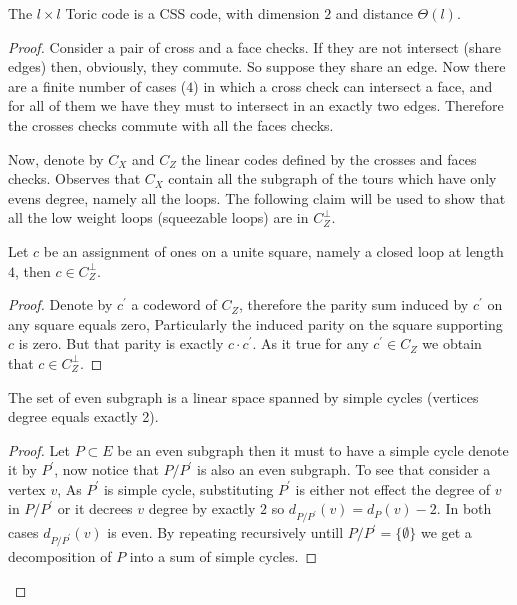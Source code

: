 \begin{claim}
  The $l \times l$  Toric code is a CSS code, with dimension $2$ and distance $\Theta\left( l \right)$.   
\end{claim}
\begin{proof}
  Consider a pair of cross and a face checks. If they are not intersect (share edges) then, obviously, they commute. So suppose they share an edge. Now there are a finite number of cases ($4$) in which a cross check can intersect a face, and for all of them we have they must to intersect in an exactly two edges. Therefore the crosses checks commute with all the faces checks. 

  Now, denote by $C_{X}$ and $C_{Z}$ the linear codes defined by the crosses and faces checks. Observes that $C_{X}$ contain all the subgraph of the tours which have only evens degree, namely all the loops. The following claim will be used to show that all the low weight loops (squeezable loops) are in $C_{Z}^{\perp}$. 
  \begin{claim} \label{claim:square}
    Let $c$ be an assignment of ones on a unite square, namely a closed loop at length $4$, then $c \in C_{Z}^{\perp}$.  
  \end{claim}
  \begin{proof}
    Denote by $c^{\prime}$ a codeword of $C_{Z}$, therefore the parity sum induced by $c^{\prime}$ on any square equals zero, Particularly the induced parity on the square supporting $c$ is zero. But that parity is exactly $c\cdot c^{\prime}$. As it true for any $c^{\prime} \in C_{Z}$ we obtain that $c \in C_{Z}^{\perp}$.  
  \end{proof}
  \begin{claim} \label{claim:velen}
    The set of even subgraph is a linear space spanned by simple cycles (vertices degree equals exactly 2).
  \end{claim}
  \begin{proof}
    Let $P \subset E$ be an even subgraph then it must to have a simple cycle denote it by $P^{\prime}$, now notice that $P/P^\prime$ is also an even subgraph. To see that consider a vertex $v$, As $P^{\prime}$ is simple cycle, substituting $P^{\prime}$ is either not effect the degree of $v$ in $P/P^{\prime}$ or it decrees $v$ degree by exactly $2$ so $d_{P/P^{\prime}}\left( v \right) = d_{P}\left( v \right) - 2$. In both cases $d_{P/P^{\prime}}\left( v \right)$ is even.
    By repeating recursively untill $P/P^{\prime} = \{ \emptyset \}$ we get a decomposition of $P$ into a sum of simple cycles.   
  \end{proof}


\end{proof}
